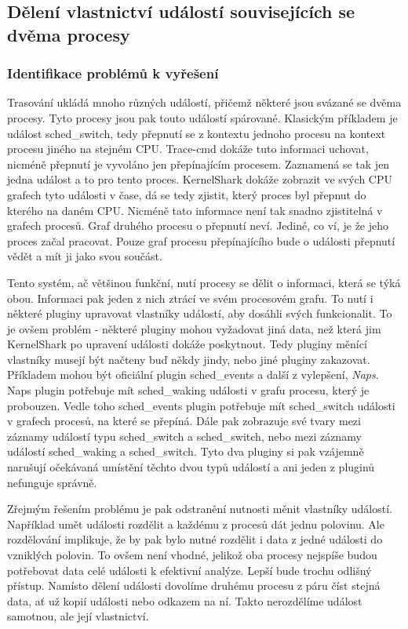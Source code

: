 \subsection{Dělení vlastnictví událostí souvisejících se dvěma procesy}

\subsubsection*{Identifikace problémů k vyřešení}
Trasování ukládá mnoho různých událostí, přičemž některé jsou svázané se dvěma procesy. Tyto procesy jsou pak touto událostí spárované. Klasickým příkladem je událost sched\_switch, tedy přepnutí se z kontextu jednoho procesu na kontext procesu jiného na stejném CPU. Trace-cmd dokáže tuto informaci uchovat, nicméně přepnutí je vyvoláno jen přepínajícím procesem. Zaznamená se tak jen jedna událost a to pro tento proces. KernelShark dokáže zobrazit ve svých CPU grafech tyto události v čase, dá se tedy zjistit, který proces byl přepnut do kterého na daném CPU. Nicméně tato informace není tak snadno zjistitelná v grafech procesů. Graf druhého procesu o přepnutí neví. Jediné, co ví, je že jeho proces začal pracovat. Pouze graf procesu přepínajícího bude o události přepnutí vědět a mít ji jako svou součást.

Tento systém, ač většinou funkční, nutí procesy se dělit o informaci, která se týká obou. Informaci pak jeden z nich ztrácí ve svém procesovém grafu. To nutí i některé pluginy upravovat vlastníky událostí, aby dosáhli svých funkcionalit. To je ovšem problém - některé pluginy mohou vyžadovat jiná data, než která jim KernelShark po upravení události dokáže poskytnout. Tedy pluginy měnící vlastníky musejí být načteny buď někdy jindy, nebo jiné pluginy zakazovat. Příkladem mohou být oficiální plugin sched\_events a další z vylepšení, \emph{Naps}. Naps plugin potřebuje mít sched\_waking události v grafu procesu, který je probouzen. Vedle toho sched\_events plugin potřebuje mít sched\_switch události v grafech procesů, na které se přepíná. Dále pak zobrazuje své tvary mezi záznamy událostí typu sched\_switch a sched\_switch, nebo mezi záznamy událostí sched\_waking a sched\_switch. Tyto dva pluginy si pak vzájemně narušují očekávaná umístění těchto dvou typů událostí a ani jeden z pluginů nefunguje správně.

Zřejmým řešením problému je pak odstranění nutnosti měnit vlastníky událostí. Například umět události rozdělit a každému z procesů dát jednu polovinu. Ale rozdělování implikuje, že by pak bylo nutné rozdělit i data z jedné události do vzniklých polovin. To ovšem není vhodné, jelikož oba procesy nejspíše budou potřebovat data celé události k efektivní analýze. Lepší bude trochu odlišný přístup. Namísto dělení události dovolíme druhému procesu z páru číst stejná data, ať už kopií události nebo odkazem na ní. Takto nerozdělíme událost samotnou, ale její vlastnictví.

